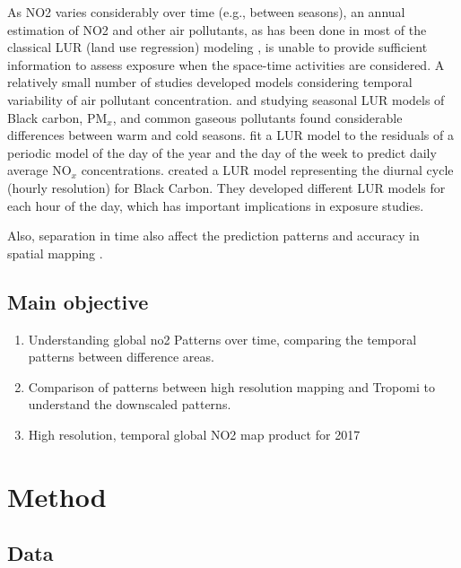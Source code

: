 \documentclass{article}
\begin{document}
As NO2 varies considerably over time (e.g., between seasons), an annual estimation of NO2 and other air pollutants, as has been done in most of the classical LUR (land use regression) modeling \citep{Eeftens2012}, is unable to provide sufficient information to assess exposure when the space-time activities are considered. A relatively small number of studies developed models considering temporal variability of air pollutant concentration. \cite{BONIARDI2019108520} and \cite{CORDIOLI20171075} studying seasonal LUR models of Black carbon, PM$_x$, and common gaseous pollutants found considerable differences between warm and cold seasons.  \cite{rahman2017development} fit a LUR model to the residuals of a  periodic model of the day of the year and the day of the week to predict daily average  NO$_x$ concentrations. \cite{dons2013modeling} created a LUR model representing the diurnal cycle (hourly resolution) for Black Carbon. They developed different LUR models for each hour of the day, which has important implications in exposure studies.

Also, separation in time also affect the prediction patterns and accuracy in spatial mapping \citep{LU2020105856}.


\subsection{Main objective}
 
 \begin{enumerate}
    
\item Understanding global no2
Patterns over time, comparing the temporal patterns between difference areas.


\item
Comparison of patterns between high resolution mapping and Tropomi to understand the downscaled patterns.

\item High resolution,  temporal global NO2 map product for 2017

\end{enumerate}


 

\section{Method}
\subsection{Data}
\end{document}
